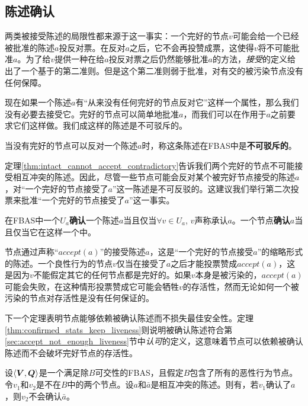 \subsection{陈述确认}

两类被接受陈述的局限性都来源于这一事实：一个完好的节点$v$可能会给一个已经被批准的陈述$a$投反对票。在反对$a$之后，它不会再投赞成票，这使得$v$将不可能批准$a$。为了给$v$提供一种在给$a$投反对票之后仍然能够批准$a$的方法，\textit{接受}的定义给出了一个基于{\vblock}的第二准则。但是这个第二准则弱于批准，对有{\quorum}交的被污染节点没有任何保障。

现在如果一个陈述$a$有``从来没有任何完好的节点反对它''这样一个属性，那么我们没有必要去接受它。完好的节点可以简单地批准$a$，而我们可以在作用于$a$之前要求它们这样做。我们成这样的陈述是不可驳斥的。

\begin{definition}[不可驳斥]
	当没有完好的节点可以反对一个陈述$a$时，称这条陈述在FBAS中是\textbf{不可驳斥的}。
\end{definition}

定理\ref{thm:intact_cannot_accept_contradictory}告诉我们两个完好的节点不可能接受相互冲突的陈述。因此，尽管一些节点可能会反对某个被完好节点接受的陈述$a$，对``一个完好的节点接受了$a$''这一陈述是不可反驳的。这建议我们举行第二次投票来批准``一个完好的节点接受了$a$''这一事实。

\begin{definition}[确认]
	在FBAS中一个{\quorum}$U_a$\textbf{确认}一个陈述$a$当且仅当$\forall v\in U_a$, $v$声称承认$a$。一个节点\textbf{确认}$a$当且仅当它在这样一个{\quorum}中。
\end{definition}

节点通过声称``$accept(a)$''的接受陈述$a$，这是``一个完好的节点接受$a$''的缩略形式的陈述。一个良性行为的节点$v$仅当在接受了$a$之后才能投票赞成$accept(a)$，这是因为$v$不能假定其它的任何节点都是完好的。如果$v$本身是被污染的，$accept(a)$可能会失败，在这种情形投票赞成它可能会牺牲$v$的存活性，然而无论如何一个被污染的节点对存活性是没有任何保证的。

下一个定理表明节点能够依赖被确认陈述而不损失最佳安全性。定理\ref{thm:confirmed_stats_keep_liveness}则说明被确认陈述符合第\ref{sec:accept_not_enough_liveness}节中\textit{认可}的定义，这意味着节点可以依赖被确认陈述而不会破坏完好节点的存活性。

\begin{theorem}\label{thm:confirmed_stats_keep_safety}
	设$\langle{\bm V},{\bm Q}\rangle$是一个满足除$B${\quorum}可交性的FBAS，且假定$B$包含了所有的恶性行为节点。令$v_1$和$v_2$是不在$B$中的两个节点。设$a$和$\bar a$是相互冲突的陈述。则有，若$v_1$确认了$a$，则$v_2$不会确认$\bar a$。
\end{theorem}

